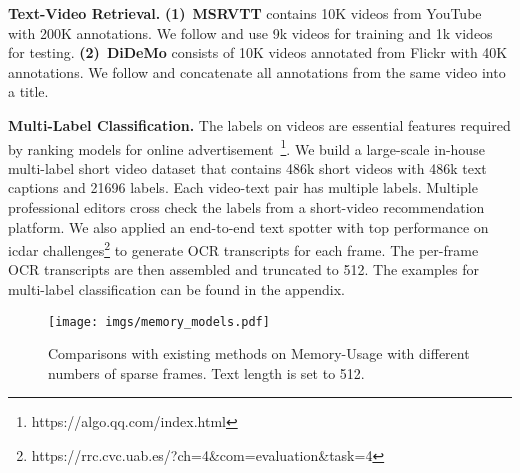 \documentclass[10pt,twocolumn,letterpaper]{article}
\begin{document}
\textbf{Text-Video Retrieval.} \textbf{(1)}~\textbf{MSRVTT} contains 10K videos from YouTube with 200K annotations. We follow \cite{Fu2021VIOLETE} and use 9k videos for training and 1k videos for testing.
\textbf{(2)}~\textbf{DiDeMo} consists of 10K videos annotated from Flickr with 40K annotations. We follow \cite{Lei2021Less} and concatenate all annotations from the same video into a title. 

\textbf{Multi-Label Classification.}
The labels on videos are essential features required by ranking models for online advertisement~\footnote{https://algo.qq.com/index.html}. 
We build a large-scale in-house multi-label short video dataset that contains 486k short videos with 486k text captions and 21696 labels. Each video-text pair has multiple labels. Multiple professional editors cross check the labels from a short-video recommendation platform. We also applied an end-to-end text spotter with top performance on icdar challenges\footnote{https://rrc.cvc.uab.es/?ch=4\&com=evaluation\&task=4} to generate OCR transcripts for each frame. The per-frame OCR transcripts are then assembled and truncated to 512. The examples for multi-label classification can be found in the appendix.
\begin{figure}[!t]
\centering
\texttt{[image: imgs/memory\_models.pdf]}
\vspace{-1ex}
\caption{
Comparisons with existing methods on Memory-Usage with different numbers of sparse frames. Text length is set to 512. 
}
\label{fig:memory_models}
\vspace{-3ex}
\end{figure} 
\vspace{-1ex}
\end{document}
